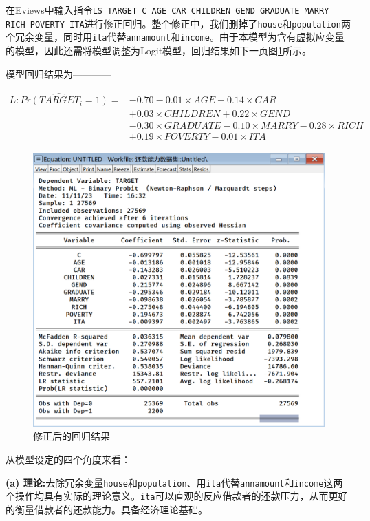 \documentclass[13.5pt,hyperref,a4paper,UTF8]{ctexart}
\begin{document}
在Eviews中输入指令\texttt{LS TARGET C AGE CAR CHILDREN GEND GRADUATE MARRY RICH POVERTY ITA}进行修正回归。整个修正中，我们删掉了\texttt{house}和\texttt{population}两个冗余变量，同时用\texttt{ita}代替\texttt{annamount}和\texttt{income}。由于本模型为含有虚拟应变量的模型，因此还需将模型调整为Logit模型，回归结果如下一页图\ref{修正后的回归结果模型1}所示。

模型回归结果为————

\begin{equation}
    \begin{split}
        \widehat{L:Pr(TARGET_i=1)}=&-0.70 - 0.01\times AGE - 0.14\times CAR \\ &  + 0.03\times CHILDREN + 0.22\times GEND \\ & - 0.30\times GRADUATE - 0.10\times MARRY - 0.28\times RICH \\ &  + 0.19\times POVERTY - 0.01\times ITA
    \end{split}
\end{equation}

\begin{figure}[H]
    \centering
    \includegraphics[width=1\linewidth]{figures//3回归//回归1/修正回归.png}
    \caption{修正后的回归结果}
    \label{修正后的回归结果模型1}
\end{figure}

从模型设定的四个角度来看：

\quad \textbf{(a) 理论:}\quad 去除冗余变量\texttt{house}和\texttt{population}、用\texttt{ita}代替\texttt{annamount}和\texttt{income}这两个操作均具有实际的理论意义。\texttt{ita}可以直观的反应借款者的还款压力，从而更好的衡量借款者的还款能力。具备经济理论基础。
\end{document}
